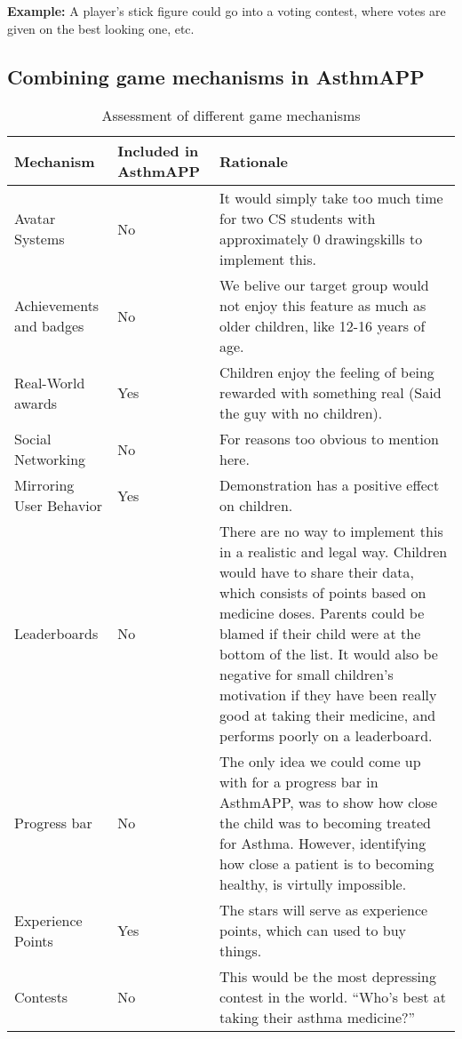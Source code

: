 \textbf{Example:} A player's stick figure could go into a voting contest, where votes are given on the best looking one, etc. 

\subsection{Combining game mechanisms in AsthmAPP}


\begin{table}[H]
\begin{tabular}{| p{3.0cm} | p{2.5cm} | p{8.0cm} | }
	\hline
	\textbf{Mechanism} & \textbf{Included in AsthmAPP} & \textbf{Rationale} \\
	\hline
	Avatar Systems & No & It would simply take too much time for two CS students with approximately 0 drawingskills to implement this. \\
	\hline
	Achievements and badges & No & We belive our target group would not enjoy this feature as much as older children, like 12-16 years of age.  \\
	\hline 
	Real-World awards & Yes & Children enjoy the feeling of being rewarded with something real (Said the guy with no children). \\
	\hline
	Social Networking & No & For reasons too obvious to mention here. \\
	\hline
	Mirroring User Behavior & Yes & Demonstration has a positive effect on children.
	\\
	\hline
	Leaderboards & No & There are no way to implement this in a realistic and legal way. Children would have to share their data, which consists of points based on medicine doses. Parents could be blamed if their child were at the bottom of the list. It would also be negative for small children's motivation if they have been really good at taking their medicine, and performs poorly on a leaderboard. 
	\\
	\hline
	Progress bar & No & The only idea we could come up with for a progress bar in AsthmAPP, was to show how close the child was to becoming treated for Asthma. However, identifying how close a patient is to becoming healthy, is virtully impossible. 
	\\
	\hline
	Experience Points & Yes & The stars will serve as experience points, which can used to buy things. 
	\\
	\hline
	Contests & No & This would be the most depressing contest in the world. ``Who's best at taking their asthma medicine?''   
	\\
	\hline
\end{tabular}
\caption{Assessment of different game mechanisms}
\label{tab:game-mech-in-astmapp}
\end{table}




